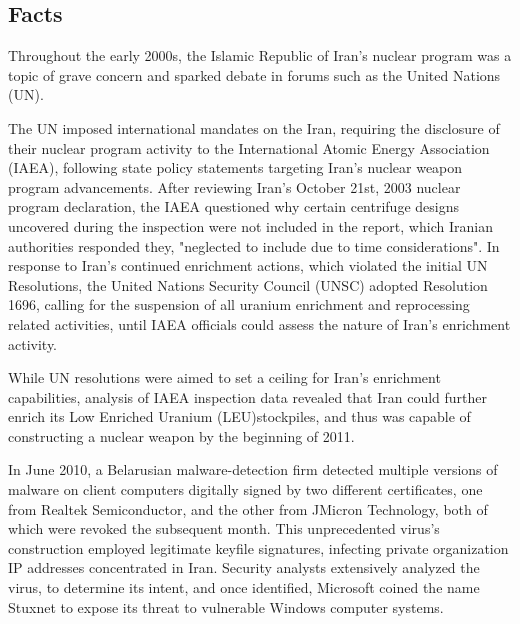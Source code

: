\documentclass[12pt]{article}
\begin{document}
\begin{multicols}{2}

\section{Facts}

Throughout the early 2000s, the Islamic Republic of Iran's nuclear program was a topic of grave concern and sparked debate in forums such as the United Nations (UN).\cite{unitedNationsResolutions}

The UN imposed international mandates on the Iran, requiring the disclosure of their nuclear program activity to the International Atomic Energy Association (IAEA), following state policy statements targeting Iran's nuclear weapon program advancements. After reviewing Iran's October 21st, 2003 nuclear program declaration, the IAEA questioned why certain centrifuge designs uncovered during the inspection were not included in the report, which Iranian authorities responded they, "neglected to include due to time considerations".\cite{implementationOfNPTSafeguards} In response to Iran's  continued enrichment actions, which violated the initial UN Resolutions, the United Nations Security Council (UNSC) adopted Resolution 1696, calling for the suspension of all uranium enrichment and reprocessing related activities, until IAEA officials could assess the nature of Iran's enrichment activity.\cite{resolution1696}

While UN resolutions were aimed to set a ceiling for Iran's enrichment capabilities, analysis of IAEA inspection data revealed that Iran could further enrich its Low Enriched Uranium (LEU)\footnotemark[1] stockpiles, and thus was capable of constructing a nuclear weapon by the beginning of 2011.\cite{hasIranAchievedaNuclearWeapon}

In June 2010, a Belarusian malware-detection firm detected multiple versions of malware on client computers digitally signed by two different certificates, one from Realtek Semiconductor, and the other from JMicron Technology, both of which were revoked the subsequent month.\cite{theRealStoryOfStuxnet} This unprecedented virus's construction employed legitimate keyfile signatures, infecting private organization IP addresses concentrated in Iran.\cite{w32.stuxnetDossier} Security analysts extensively analyzed the virus, to determine its intent, and once identified, Microsoft coined the name Stuxnet to expose its threat to vulnerable Windows computer systems.\cite{microsoftCoinsStuxnet}


\end{multicols}
\end{document}

